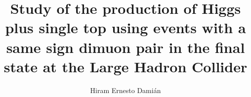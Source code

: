 \title{\Large Study of the production of Higgs plus single top using events with a same sign dimuon pair in the final state at the Large Hadron Collider}


\author{Hiram Ernesto Dami\'an}









     
